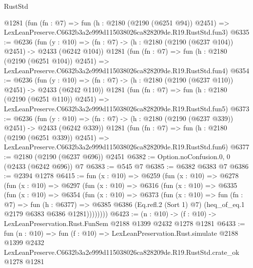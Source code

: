 \begin{lexlean}{RustStd}
\begin{coremodule}
    @1281
    (fun (fn : @7) =>
    fun (h : @2180 (@2190 (@6251 @94)) @2451) =>
    LexLeanPreserve.C6632b3a2e999d115038026ca828209de.R19.RustStd.fun3)
@6335 := @6236
    (fun (y : @10) => (fn : @7) -> (h : @2180 (@2190 (@6237 @104)) @2451) -> @2433 (@6242 @104))
    @1281
    (fun (fn : @7) =>
    fun (h : @2180 (@2190 (@6251 @104)) @2451) =>
    LexLeanPreserve.C6632b3a2e999d115038026ca828209de.R19.RustStd.fun4)
@6354 := @6236
    (fun (y : @10) => (fn : @7) -> (h : @2180 (@2190 (@6237 @110)) @2451) -> @2433 (@6242 @110))
    @1281
    (fun (fn : @7) =>
    fun (h : @2180 (@2190 (@6251 @110)) @2451) =>
    LexLeanPreserve.C6632b3a2e999d115038026ca828209de.R19.RustStd.fun5)
@6373 := @6236
    (fun (y : @10) => (fn : @7) -> (h : @2180 (@2190 (@6237 @339)) @2451) -> @2433 (@6242 @339))
    @1281
    (fun (fn : @7) =>
    fun (h : @2180 (@2190 (@6251 @339)) @2451) =>
    LexLeanPreserve.C6632b3a2e999d115038026ca828209de.R19.RustStd.fun6)
@6377 := @2180 (@2190 (@6237 @696)) @2451
@6382 := Option.noConfusion.{0, 0} (@2433 (@6242 @696)) @7
@6383 := @545 @7
@6385 := @6382 @6383 @7
@6386 := @2394 @1278
@6415 := fun (x : @10) =>
  @6259
    (fun (x : @10) =>
    @6278
      (fun (x : @10) =>
      @6297
        (fun (x : @10) =>
        @6316
          (fun (x : @10) =>
          @6335
            (fun (x : @10) =>
            @6354
              (fun (x : @10) =>
              @6373
                (fun (x : @10) =>
                fun (fn : @7) =>
                fun (h : @6377) =>
                @6385 @6386 (Eq.refl.{2} (Sort 1) @7) (heq_of_eq.{1} @2179 @6383 @6386 @1281))))))))
@6423 := (n : @10) -> (f : @10) -> LexLeanPreservation.Rust.FunSem @2188 @1399 @2432 @1278 @1281
@6433 := fun (n : @10) =>
  fun (f : @10) =>
  LexLeanPreservation.Rust.simulate
    @2188
    @1399
    @2432
    LexLeanPreserve.C6632b3a2e999d115038026ca828209de.R19.RustStd.crate_ok
    @1278
    @1281
\end{coremodule}
\end{lexlean}
